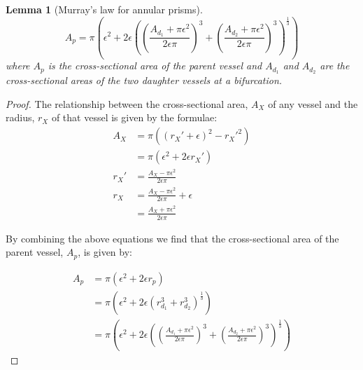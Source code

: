 \documentclass[12pt]{article} %
\newtheorem{lem}[thm]{Lemma}
\theoremstyle{definition}
\begin{document}
\begin{lem}[Murray's law for annular prisms]
 \[A_p = \pi\left(\epsilon^{2} + 2\epsilon \left(\left( \frac{A_{d_{1}} + \pi\epsilon^{2}}{2\epsilon\pi} \right)^{3} + \left( \frac{A_{d_{2}} + \pi\epsilon^{2}}{2\epsilon\pi} \right)^{3}\right)^{\frac{1}{3}}\right)\]
where $A_p$ is the cross-sectional area of the parent vessel and $A_{d_{1}}$ and $A_{d_{2}}$ are the cross-sectional areas of the two daughter vessels at a bifurcation.
\end{lem}
\begin{proof}
The relationship between the cross-sectional area, $A_{X}$ of any vessel and the radius, $r_{X}$ 
of that vessel is given by the formulae:
\begin{align*}
 A_{X} &= \pi((r_{X}' + \epsilon)^{2} - r_{X}'^{2})\\
 &= \pi(\epsilon^{2} + 2\epsilon r_{X}')\\
 r_{X}' &= \frac{A_{X} - \pi\epsilon^{2}}{2\epsilon\pi}\\
 r_{X} &=  \frac{A_{X} - \pi\epsilon^{2}}{2\epsilon\pi} + \epsilon \\
 &= \frac{A_{X} + \pi\epsilon^{2}}{2\epsilon\pi}
\end{align*}

By combining the above equations we find that the cross-sectional area of the parent
 vessel, $A_{p}$, is given by:

\begin{align*}
A_{p} &= \pi(\epsilon^{2} + 2\epsilon r_{p}) \\
&= \pi\left(\epsilon^{2} + 2\epsilon (r_{d_{1}}^{3} + r_{d_{2}}^{3})^{\frac{1}{3}}\right)\\
&= \pi\left(\epsilon^{2} + 2\epsilon \left(\left( \frac{A_{d_{1}} + \pi\epsilon^{2}}{2\epsilon\pi} \right)^{3} + \left( \frac{A_{d_{2}} + \pi\epsilon^{2}}{2\epsilon\pi} \right)^{3}\right)^{\frac{1}{3}}\right)
\end{align*}
\end{proof}






\end{document}
